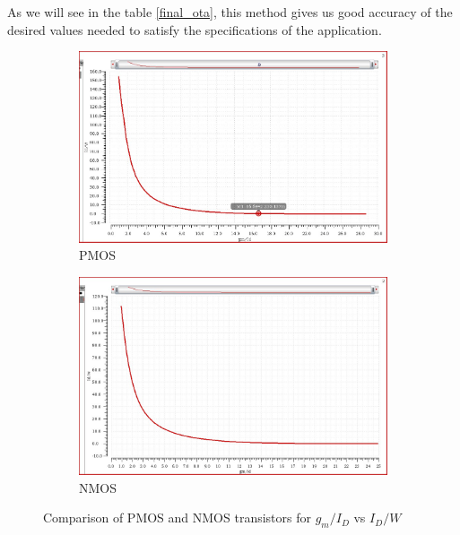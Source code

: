 As we will see in the table \ref{final_ota}, this method gives us good accuracy of the desired values needed to satisfy the specifications of the application.


\begin{figure}[ht!]
\centering
\begin{subfigure}[b]{0.85\linewidth}
\includegraphics[width = \textwidth]{images/Id_w_vs_gm_id_pmos.jpg}
\caption{PMOS}
\label{fig:gm_pmos}
\end{subfigure}

\begin{subfigure}[b]{0.85\linewidth}
\includegraphics[width = \textwidth]{images/gm_id_w_nmos.jpg}
\caption{NMOS}
\label{fig:gm_nmos}
\end{subfigure}

\caption{Comparison of PMOS and NMOS transistors for $g_m/I_D$ vs $I_D/W$}
\label{fig:comp_pmos_nmos}
\end{figure}



